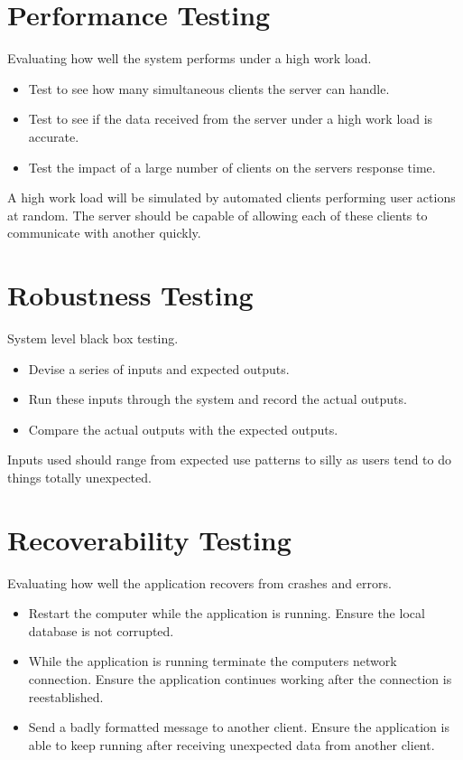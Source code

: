 \section{Performance Testing}
Evaluating how well the system performs under a high work load.
\begin{itemize}
\item Test to see how many simultaneous clients the server can handle.
\item Test to see if the data received from the server under a high work load is 
accurate.
\item Test the impact of a large number of clients on the servers response time.
\end{itemize}
A high work load will be simulated by automated clients performing user actions
at random. The server should be capable of allowing each of these clients to
communicate with another quickly.

\section{Robustness Testing}
System level black box testing.  
\begin{itemize}
\item Devise a series of inputs and expected outputs.
\item Run these inputs through the system and record the actual outputs.
\item Compare the actual outputs with the expected outputs.
\end{itemize}
Inputs used should range from expected use patterns to silly as users tend to do 
things totally unexpected.

\section{Recoverability Testing}
Evaluating how well the application recovers from crashes and errors.
\begin{itemize}
\item Restart the computer while the application is running.
Ensure the local database is not corrupted.
\item While the application is running terminate the computers network 
connection. Ensure the application continues working after the connection is
reestablished.
\item Send a badly formatted message to another client. Ensure the application 
is able to keep running after receiving unexpected data from another client.
\end{itemize}


